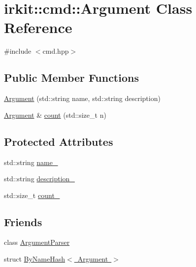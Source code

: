 \hypertarget{classirkit_1_1cmd_1_1Argument}{}\section{irkit\+:\+:cmd\+:\+:Argument Class Reference}
\label{classirkit_1_1cmd_1_1Argument}


{\ttfamily \#include $<$cmd.\+hpp$>$}

\subsection*{Public Member Functions}
\begin{DoxyCompactItemize}
\item 
\mbox{\hyperlink{classirkit_1_1cmd_1_1Argument_aa7a243f2781450207c11453eb2936c7d}{Argument}} (std\+::string name, std\+::string description)
\item 
\mbox{\hyperlink{classirkit_1_1cmd_1_1Argument}{Argument}} \& \mbox{\hyperlink{classirkit_1_1cmd_1_1Argument_a362215b0f36512e47e3a7f7f57de4617}{count}} (std\+::size\+\_\+t n)
\end{DoxyCompactItemize}
\subsection*{Protected Attributes}
\begin{DoxyCompactItemize}
\item 
std\+::string \mbox{\hyperlink{classirkit_1_1cmd_1_1Argument_a2201ab317f191bed438cce02d93aade1}{name\+\_\+}}
\item 
std\+::string \mbox{\hyperlink{classirkit_1_1cmd_1_1Argument_a50410b20d7fec9d80639a56023e6792d}{description\+\_\+}}
\item 
std\+::size\+\_\+t \mbox{\hyperlink{classirkit_1_1cmd_1_1Argument_aea9c6cc6c2126a2d9dba939f01724aed}{count\+\_\+}}
\end{DoxyCompactItemize}
\subsection*{Friends}
\begin{DoxyCompactItemize}
\item 
class \mbox{\hyperlink{classirkit_1_1cmd_1_1Argument_a55c9e1ac006a645af402e3aee6b64e00}{Argument\+Parser}}
\item 
struct \mbox{\hyperlink{classirkit_1_1cmd_1_1Argument_a6821014d75c5475d97122c1be09079d8}{By\+Name\+Hash$<$ Argument $>$}}
\end{DoxyCompactItemize}


